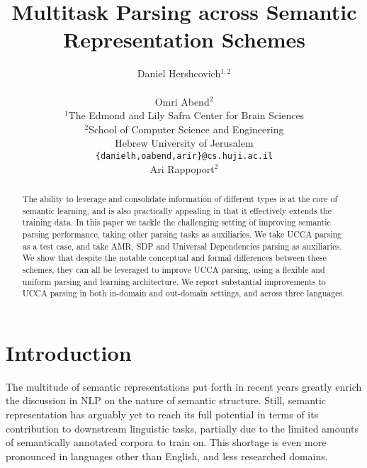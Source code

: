 \documentclass[11pt,a4paper]{article}
\title{Multitask Parsing across Semantic Representation Schemes}
\author{Daniel Hershcovich$^{1,2}$ \\
  \\\And
  Omri Abend$^2$ \\
  $^1$The Edmond and Lily Safra Center for Brain Sciences \\
  $^2$School of Computer Science and Engineering \\
  Hebrew University of Jerusalem \\
  \texttt{\{danielh,oabend,arir\}@cs.huji.ac.il}
  \\\And
  Ari Rappoport$^2$
}
\date{}
\begin{document}
\maketitle

\begin{abstract}
The ability to leverage and consolidate information of different types
is at the core of semantic learning, and is also practically appealing
in that it effectively extends the training data. In this paper we
tackle the challenging setting of improving semantic parsing
performance, taking other parsing tasks as auxiliaries. We take UCCA
parsing as a test case, and take AMR, SDP and Universal Dependencies
parsing as auxiliaries. We show that despite the notable conceptual
and formal differences between these schemes, they can all be
leveraged to improve UCCA parsing, using a flexible and uniform
parsing and learning architecture. We report substantial improvements
to UCCA parsing in both in-domain and out-domain settings, and across
three languages.
\end{abstract}

\section{Introduction}\label{sec:introduction}

The multitude of semantic representations put forth in recent years greatly enrich
the discussion in NLP on the nature of semantic structure.
Still, semantic representation has arguably yet to reach its full 
potential in terms of its contribution to downstream linguistic tasks,
partially due to the limited amounts of semantically annotated
corpora to train on. This shortage is even more pronounced in 
languages other than English, and less researched domains. 

\end{document}
